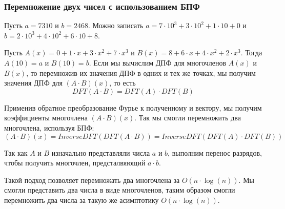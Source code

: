 \subsubsection*{Перемножение двух чисел с использованием БПФ}
Пусть $a = 7310$ и $b = 2468$. Можно записать $a = 7 \cdot 10 ^ 3 + 3 \cdot 10 ^ 2 + 1 \cdot 10 + 0$ и $b = 2 \cdot 10 ^ 3 + 4 \cdot 10 ^ 2 + 6 \cdot 10 + 8$.

Пусть $A(x) = 0 + 1 \cdot x + 3 \cdot x ^ 2 + 7 \cdot x ^ 3$ и $B(x) = 8 + 6 \cdot x + 4 \cdot x ^ 2 + 2 \cdot x ^ 3$. Тогда $A(10) = a$ и $B(10) = b$. Если мы вычислим ДПФ для многочленов $A(x)$ и $B(x)$, то перемножив их значения ДПФ в одних и тех же точках, мы получим значения ДПФ для $(A \cdot B) (x)$, то есть
$$DFT(A \cdot B) = DFT(A) \cdot DFT(B)$$

Применив обратное преобразование Фурье к полученному и вектору, мы получим коэффициенты многочлена $(A \cdot B) (x)$. Так мы смогли перемножить два многочлена, используя БПФ:
$$ (A \cdot B) (x) = InverseDFT(DFT(A \cdot B)) = InverseDFT(DFT(A) \cdot DFT(B)) $$

Так как $A$ и $B$ изначально представляли числа $a$ и $b$, выполним перенос разрядов, чтобы получить многочлен, предсталвяющий $a \cdot b$.

Такой подход позволяет перемножать два многочлена за $O(n \cdot \log(n))$. Мы смогли представить два числа в виде многочленов, таким образом смогли перемножить два числа за такую же асимптотику $O(n \cdot \log(n))$.

\pagebreak
